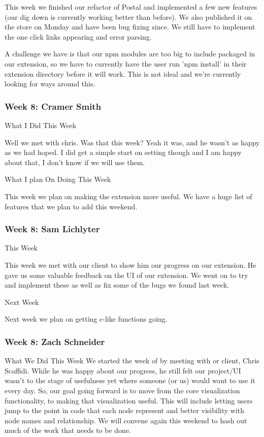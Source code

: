 This week we finished our refactor of Postal and implemented a few new features (our dig down is currently working better than before). We also published it on the store on Monday and have been bug fixing since. We still have to implement the one click links appearing and error parsing. 

A challenge we have is that our npm modules are too big to include packaged in our extension, so we have to currently have the user run 'npm install' in their extension directory before it will work. This is not ideal and we're currently looking for ways around this.

\subsubsection{Week 8: Cramer Smith}

What I Did This Week

Well we met with chris. Was that this week? Yeah it was, and he wasn't as happy as we had hoped. I did get a simple start on setting though and I am happy about that, I don't know if we will use them.

What I plan On Doing This Week

This week we plan on making the extension more useful. We have a huge list of features that we plan to add this weekend.

\subsubsection{Week 8: Sam Lichlyter}

This Week

This week we met with our client to show him our progress on our extension. He gave us some valuable feedback on the UI of our extension. We went on to try and implement these as well as fix some of the bugs we found last week.

Next Week

Next week we plan on getting c-like functions going.

\subsubsection{Week 8: Zach Schneider}

What We Did This Week
We started the week of by meeting with or client, Chris Scaffidi. While he was happy about our progress, he still felt our project/UI wasn't to the stage of usefulness yet where someone (or us) would want to use it every day. So, our goal going forward is to move from the core visualization functionality, to making that visualization useful. This will include letting users jump to the point in code that each node represent and better visibility with node names and relationship. We will convene again this weekend to hash out much of the work that needs to be done.


